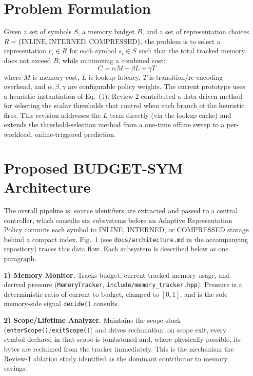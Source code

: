 \documentclass[conference]{IEEEtran}
\begin{document}
\section{Problem Formulation}
Given a set of symbols $S$, a memory budget $B$, and a set of representation
choices $R = \{\text{INLINE}, \text{INTERNED}, \text{COMPRESSED}\}$, the
problem is to select a representation $r_i \in R$ for each symbol $s_i \in
S$ such that the total tracked memory does not exceed $B$, while minimizing
a combined cost:
\begin{equation}
C = \alpha M + \beta L + \gamma T
\end{equation}
where $M$ is memory cost, $L$ is lookup latency, $T$ is transition/re-encoding
overhead, and $\alpha, \beta, \gamma$ are configurable policy weights. The
current prototype uses a heuristic instantiation of Eq.~(1). Review-2
contributed a data-driven method for selecting the scalar thresholds that
control when each branch of the heuristic fires. This revision addresses the
$L$ term directly (via the lookup cache) and extends the threshold-selection
method from a one-time offline sweep to a per-workload, online-triggered
prediction.

\section{Proposed BUDGET-SYM Architecture}
The overall pipeline is: source identifiers are extracted and passed to a
central controller, which consults six subsystems before an Adaptive
Representation Policy commits each symbol to INLINE, INTERNED, or
COMPRESSED storage behind a compact index. Fig.~1 (see
\texttt{docs/architecture.md} in the accompanying repository) traces this
data flow. Each subsystem is described below as one paragraph.

\textbf{1) Memory Monitor.} Tracks budget, current tracked-memory usage, and
derived pressure (\texttt{MemoryTracker}, \texttt{include/memory\_tracker.hpp}).
Pressure is a deterministic ratio of current to budget, clamped to $[0,1]$,
and is the sole memory-side signal \texttt{decide()} consults.

\textbf{2) Scope/Lifetime Analyzer.} Maintains the scope stack
(\texttt{enterScope()}/\texttt{exitScope()}) and drives reclamation:
on scope exit, every symbol declared in that scope is tombstoned and, where
physically possible, its bytes are reclaimed from the tracker immediately.
This is the mechanism the Review-1 ablation study identified as the dominant
contributor to memory savings.
\end{document}
